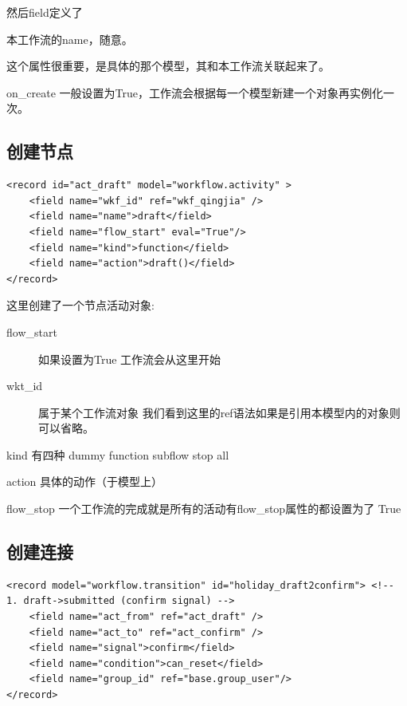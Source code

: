 \documentclass[11pt,a4paper]{sphinxmanual}
\begin{document}
然后field定义了

\begin{description}
\item[{name}] 本工作流的name，随意。
\item[{osv}] 这个属性很重要，是具体的那个模型，其和本工作流关联起来了。
\item on\_create 一般设置为True，工作流会根据每一个模型新建一个对象再实例化一次。
\end{description}


\subsection{创建节点}
\label{sec-10-2-2}
\begin{Verbatim}
<record id="act_draft" model="workflow.activity" >
    <field name="wkf_id" ref="wkf_qingjia" />
    <field name="name">draft</field>
    <field name="flow_start" eval="True"/>
    <field name="kind">function</field>
    <field name="action">draft()</field>
</record>
\end{Verbatim}

这里创建了一个节点活动对象:

\begin{description}
\item[{flow\_start}] 如果设置为True 工作流会从这里开始

\item[{wkt\_id}] 属于某个工作流对象   我们看到这里的ref语法如果是引用本模型内的对象则可以省略。
\end{description}

kind  有四种 dummy function subflow stop all

action 具体的动作（于模型上）

flow\_stop 一个工作流的完成就是所有的活动有flow\_stop属性的都设置为了 True



\subsection{创建连接}
\label{sec-10-2-3}
\begin{Verbatim}
<record model="workflow.transition" id="holiday_draft2confirm"> <!-- 1. draft->submitted (confirm signal) -->
    <field name="act_from" ref="act_draft" />
    <field name="act_to" ref="act_confirm" />
    <field name="signal">confirm</field>
    <field name="condition">can_reset</field>
    <field name="group_id" ref="base.group_user"/>
</record>
\end{Verbatim}
\end{document}
